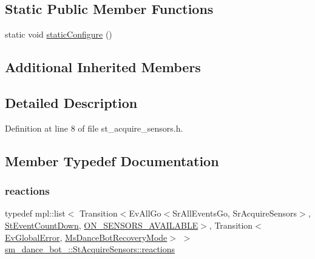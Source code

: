 \subsection*{Static Public Member Functions}
\begin{DoxyCompactItemize}
\item 
static void \hyperlink{structsm__dance__bot__2_1_1StAcquireSensors_aaeeb0ac3d0e8438deb7c29d07907674e}{static\+Configure} ()
\end{DoxyCompactItemize}
\subsection*{Additional Inherited Members}


\subsection{Detailed Description}


Definition at line 8 of file st\+\_\+acquire\+\_\+sensors.\+h.



\subsection{Member Typedef Documentation}
\mbox{\label{structsm__dance__bot__2_1_1StAcquireSensors_ac3cddfc8cddd50823cee34f0305eaf31}} 
\subsubsection{\texorpdfstring{reactions}{reactions}}
{\footnotesize\ttfamily typedef mpl\+::list$<$ Transition$<$Ev\+All\+Go$<$Sr\+All\+Events\+Go, Sr\+Acquire\+Sensors$>$, \hyperlink{structsm__dance__bot__2_1_1StEventCountDown}{St\+Event\+Count\+Down}, \hyperlink{structsm__dance__bot__2_1_1StAcquireSensors_1_1ON__SENSORS__AVAILABLE}{O\+N\+\_\+\+S\+E\+N\+S\+O\+R\+S\+\_\+\+A\+V\+A\+I\+L\+A\+B\+LE}$>$, Transition$<$\hyperlink{structsm__dance__bot__2_1_1EvGlobalError}{Ev\+Global\+Error}, \hyperlink{classsm__dance__bot__2_1_1MsDanceBotRecoveryMode}{Ms\+Dance\+Bot\+Recovery\+Mode}$>$ $>$ \hyperlink{structsm__dance__bot__2_1_1StAcquireSensors_ac3cddfc8cddd50823cee34f0305eaf31}{sm\+\_\+dance\+\_\+bot\+\_\+::\+St\+Acquire\+Sensors\+::reactions}}



